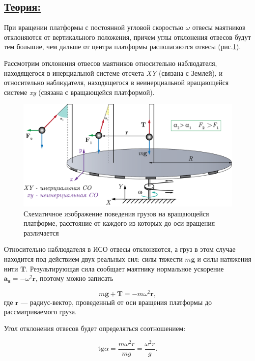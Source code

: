 \documentclass[14pt,a4paper,oneside]{extarticle}	%
\begin{document}
\newpage
\subsection*{\underline{Теория:}}

При вращении платформы с постоянной угловой скоростью $ \omega $ отвесы маятников отклоняются от вертикального положения, причем углы отклонения отвесов будут тем большие, чем дальше от центра платформы располагаются отвесы (рис.\ref{platform-3}).

Рассмотрим отклонения отвесов маятников относительно наблюдателя, находящегося в инерциальной
системе отсчета \textit{XY} (связана с Землей), и относительно наблюдателя, находящегося в неинерциальной вращающейся системе \textit{xy} (связана с вращающейся платформой). 

\begin{figure}[H] 
	\centering 		
	\includegraphics[width=0.9\linewidth]{platform-3.png} 
	\caption{Схематичное изображение поведения грузов на вращающейся платформе, расстояние от каждого из которых до оси вращения различается}
	\label{platform-3}
\end{figure}

Относительно наблюдателя в ИСО отвесы отклоняются, а груз в этом случае находится под действием двух реальных сил: силы тяжести $ m\textbf{g} $ и силы натяжения нити $ \textbf{T} $.
Результирующая сила сообщает маятнику нормальное ускорение $ \textbf{a}_{\text{н}} = -\omega^{2}\textbf{r}  $, поэтому можно записать

\begin{equation}\label{platform-1eq1}
m\textbf{g}+\textbf{T}=-m\omega^{2}\textbf{r},
\end{equation}
где $ \textbf{r} $ — радиус-вектор, проведенный от оси вращения платформы до рассматриваемого груза.

Угол отклонения отвесов будет определяться соотношением:

\begin{equation}\label{platform-1eq2}
\text{tg} \alpha =\frac{m\omega^{2}r}{mg} = \frac{\omega^{2}r}{g}.
\end{equation}
\end{document}
